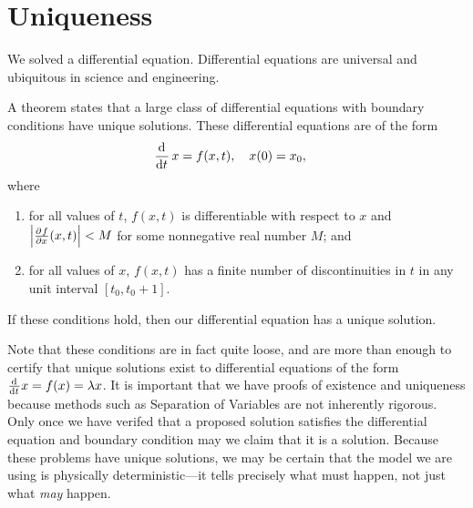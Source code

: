 \section{Uniqueness}
We solved a differential equation. Differential equations are universal and ubiquitous in science and engineering.

A theorem states that a large class of differential equations with boundary conditions have unique solutions. These differential equations are of the form
\begin{align}
  \dod{}{t} x
  &= f(x, t), \quad x(0) = x_0,
\end{align}
where
\begin{enumerate}
  \item
  for all values of \(t\), \(f(x, t)\) is differentiable with respect to \(x\) and
  \(\left| \pd{f}{x} (x,t) \right| < M\) for some nonnegative real number \(M\); and
  \item for all values of \(x\), \(f(x,t)\) has a finite number of discontinuities in \(t\) in any unit interval \([t_0, t_0 + 1]\).
\end{enumerate}
If these conditions hold, then our differential equation has a unique solution.

Note that these conditions are in fact quite loose, and are more than enough to certify that unique solutions exist to differential equations of the form \(\od{}{t} x = f(x) = \lambda x\).
It is important that we have proofs of existence and uniqueness because methods such as Separation of Variables are not inherently rigorous.
Only once we have verifed that a proposed solution satisfies the differential equation and boundary condition may we claim that it is a solution.
Because these problems have unique solutions, we may be certain that the model we are using is physically deterministic---it tells precisely what must happen, not just what \emph{may} happen.
